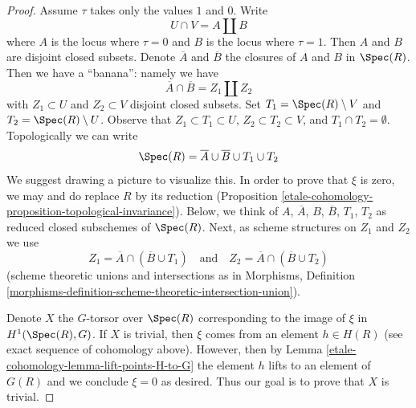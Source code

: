 \begin{proof}
\medskip\noindent
Assume $\tau$ takes only the values $1$ and $0$. Write
$$
U \cap V = A \amalg B
$$
where $A$ is the locus where $\tau = 0$ and $B$ is the locus
where $\tau = 1$. Then $A$ and $B$ are disjoint closed subsets.
Denote $\overline{A}$ and $\overline{B}$ the closures of $A$ and $B$ in
$\Spec(R)$. Then we have a ``banana'': namely
we have
$$
\overline{A} \cap \overline{B} = Z_1 \amalg Z_2
$$
with $Z_1 \subset U$ and $Z_2 \subset V$ disjoint closed subsets.
Set $T_1 = \Spec(R) \setminus V$ and $T_2 = \Spec(R) \setminus U$.
Observe that $Z_1 \subset T_1 \subset U$, $Z_2 \subset T_2 \subset V$, and
$T_1 \cap T_2 = \emptyset$. Topologically we can write
$$
\Spec(R) = \overline{A} \cup \overline{B} \cup T_1 \cup T_2
$$
We suggest drawing a picture to visualize this.
In order to prove that $\xi$ is zero, we may and do replace $R$ by
its reduction (Proposition \ref{etale-cohomology-proposition-topological-invariance}).
Below, we think of $A$, $\overline{A}$, $B$, $\overline{B}$, $T_1$, $T_2$
as reduced closed subschemes of $\Spec(R)$. Next, as scheme structures on $Z_1$
and $Z_2$ we use
$$
Z_1 = \overline{A} \cap (\overline{B} \cup T_1)
\quad\text{and}\quad
Z_2 = \overline{A} \cap (\overline{B} \cup T_2)
$$
(scheme theoretic unions and intersections as in Morphisms, Definition
\ref{morphisms-definition-scheme-theoretic-intersection-union}).

\medskip\noindent
Denote $X$ the $G$-torsor over $\Spec(R)$ corresponding to the image
of $\xi$ in $H^1(\Spec(R), G)$. If $X$ is trivial, then $\xi$
comes from an element $h \in H(R)$ (see exact sequence of cohomology
above). However, then by Lemma \ref{etale-cohomology-lemma-lift-points-H-to-G}
the element $h$ lifts to an element of $G(R)$ and we conclude
$\xi = 0$ as desired. Thus our goal is to prove that $X$ is trivial.


\end{proof}
